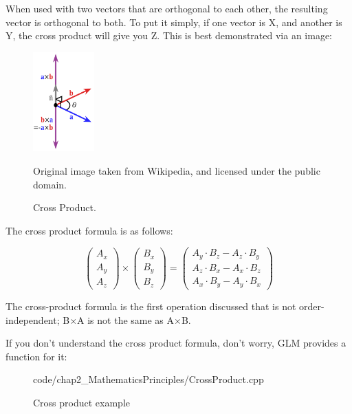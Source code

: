 \begin{sloppypar}
When used with two vectors that are orthogonal to each other, the resulting vector is orthogonal to both. To put it simply, if one vector is X, and another is Y, the cross product will give you Z. This is best demonstrated via an image:
\end{sloppypar}

\begin{frame}{}
    \begin{figure}[ht]
      \centering
      \includegraphics[width=0.21\textwidth]{images/chap2/CrossProduct.png}
      \caption*{\footnotesize Original image taken from Wikipedia, and licensed under the public domain.}
      \caption{Cross Product.}
      \label{fig:cross_product}
    \end{figure}
\end{frame}
\newpage

The cross product formula is as follows:

\begin{equation}
    \begin{pmatrix}
    A_{x}\\
    A_{y}\\
    A_{z}
    \end{pmatrix} \times \begin{pmatrix}
    B_{x}\\
    B_{y}\\
    B_{z}
    \end{pmatrix} =\begin{pmatrix}
    A_{y} \cdot B_{z} -A_{z} \cdot B_{y}\\
    A_{z} \cdot B_{x} -A_{x} \cdot B_{z}\\
    A_{x} \cdot B_{y} -A_{y} \cdot B_{x}
    \end{pmatrix}
\end{equation}

The cross-product formula is the first operation discussed that is not order-independent; B$\times$A is not the same as A$\times$B.

If you don't understand the cross product formula, don't worry, GLM provides a function for it:

\begin{figure}[ht]
    \centering
    \colorbox{backgroundcolor}{
        \parbox{0.9\textwidth}{
            
            {code/chap2_MathematicsPrinciples/CrossProduct.cpp}
        }
    }
    \caption{Cross product example}
    \label{fig:cross_product_example}
\end{figure}
